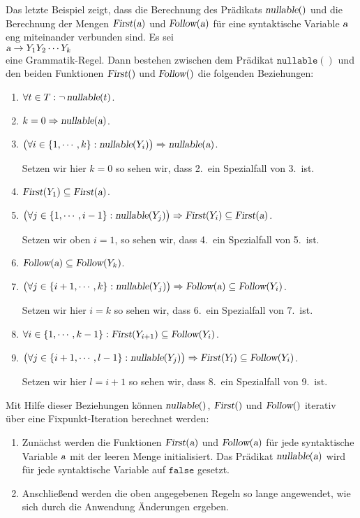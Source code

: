 \noindent
Das letzte Beispiel zeigt, dass die Berechnung des Prädikats $\textsl{nullable}()$ 
und die Berechnung der Mengen $\textsl{First}(\textsl{a})$ und $\textsl{Follow}(\textsl{a})$ für eine syntaktische
Variable $\textsl{a}$ eng miteinander verbunden sind.  
Es sei
\\[0.2cm]
\hspace*{1.3cm}
 $\textsl{a} \rightarrow Y_1 Y_2 \cdots Y_k$ 
\\[0.2cm]
eine Grammatik-Regel.
Dann bestehen zwischen dem Prädikat $\texttt{nullable}()$ und den beiden Funktionen
$\textsl{First}()$ und $\textsl{Follow}()$ die folgenden Beziehungen:
\begin{enumerate}
\item $\forall t \in T: \neg\, \textsl{nullable}(t)$.
\item $k = 0 \Rightarrow \textsl{nullable}(\textsl{a})$.
\item $\bigl(\forall i \in \{1, \cdots, k\}: \textsl{nullable}(Y_i)\bigr) \Rightarrow
       \textsl{nullable}(\textsl{a})$.

      Setzen wir hier $k=0$ so sehen wir, dass 2.~ein Spezialfall von 3.~ist.
\item $\textsl{First}(Y_1) \subseteq \textsl{First}(\textsl{a})$.
\item $\bigl(\forall j \in \{1,\cdots,i-1\}: \textsl{nullable}(Y_j)\bigr) \Rightarrow
       \textsl{First}(Y_i) \subseteq \textsl{First}(\textsl{a})$.

       Setzen wir oben $i=1$, so sehen wir, dass 4.~ein Spezialfall von 5.~ist.
\item $\textsl{Follow}(\textsl{a}) \subseteq \textsl{Follow}(Y_k)$.
\item $\bigl(\forall j \in \{i+1, \cdots, k\}: \textsl{nullable}(Y_j)\bigr) \Rightarrow 
       \textsl{Follow}(\textsl{a}) \subseteq \textsl{Follow}(Y_i)$.

      Setzen wir hier $i=k$ so sehen wir, dass 6.~ein Spezialfall von 7.~ist.
\item $\forall i \in \{1,\cdots,k-1\}:\textsl{First}(Y_{i+1}) \subseteq \textsl{Follow}(Y_i)$.
\item $\bigl(\forall j \in \{i+1, \cdots, l-1\}: \textsl{nullable}(Y_j)\bigr) \Rightarrow 
       \textsl{First}(Y_l) \subseteq \textsl{Follow}(Y_i)$.

      Setzen wir hier $l=i+1$ so sehen wir, dass 8.~ein Spezialfall von 9.~ist.
\end{enumerate}
Mit Hilfe dieser Beziehungen können $\textsl{nullable}()$, $\textsl{First}()$ und
$\textsl{Follow}()$ iterativ über eine Fixpunkt-Iteration berechnet werden:  
\begin{enumerate}
\item Zunächst werden die Funktionen $\textsl{First}(\textsl{a})$ und
      $\textsl{Follow}(\textsl{a})$ für jede syntaktische Variable $\textsl{a}$ mit der leeren Menge initialisiert.
      Das Prädikat $\textsl{nullable}(\textsl{a})$ wird für jede syntaktische Variable auf $\texttt{false}$
      gesetzt.
\item Anschließend werden die oben angegebenen Regeln so lange angewendet, wie sich durch die
      Anwendung Änderungen ergeben. 
\end{enumerate}

